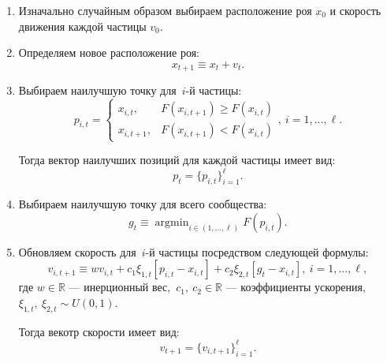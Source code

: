 \begin{enumerate}
	\item Изначально случайным образом выбираем расположение роя $x_0$ и скорость движения каждой частицы $v_0$.

	\item Определяем новое расположение роя:
	\[
		x_{t + 1} \equiv x_t + v_t.
	\]

	\item Выбираем наилучшую точку для~$i$-й частицы:
	\begin{equation}
		\label{eq:personal_best}
		p_{i, t}
		=
		\begin{cases}
			x_{i, t},
			&
			F(x_{i, t + 1}) \geq F(x_{i, t})
			\\
			x_{i, t + 1},
			&
			F(x_{i, t + 1}) < F(x_{i, t})
		\end{cases}, \ i = 1, ..., \ell.
	\end{equation}

	Тогда вектор наилучших позиций для каждой частицы имеет вид:
	\[
		p_{t} = \{p_{i, t}\}_{i = 1}^{\ell}.
	\]

	\item Выбираем наилучшую точку для всего сообщества:
	\begin{equation}
		\label{eq:social_best}
		g_{t}
		\equiv
		\mathop{\mathrm{argmin}}_{i \in (1, ..., \ell)} \limits F(p_{i, t}).
	\end{equation}

	\item Обновляем скорость для~$i$-й частицы посредством следующей формулы:
	\begin{equation}
		\label{eq:new_velocity}
		v_{i, t + 1}
		\equiv
		w
		v_{i, t}
		+
		c_1
		\xi_{1, t}
		[p_{i, t} - x_{i, t}]
		+
		c_2
		\xi_{2, t}
		[g_{t} - x_{i, t}], \
		i = 1, ..., \ell,
	\end{equation}
	где $w \in \mathbb{R}$ --- инерционный вес,~$c_1,\ c_2 \in \mathbb{R}$ --- коэффициенты ускорения, $\xi_{1, t},\ \xi_{2, t} \sim U(0, 1)$.

	Тогда векотр скорости имеет вид:
	\[
		v_{t+1} = \{v_{i, t + 1}\}_{i = 1}^{\ell}.
	\]

	\vspace{10pt}

	\begin{figure}[!h]
	\centering

\end{figure}
\end{enumerate}
